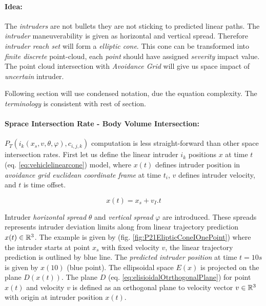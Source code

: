 \setcounter{chapter}{6}
\setcounter{section}{7}
\setcounter{subsection}{3}

\paragraph{Idea:} The \emph{intruders} are not bullets they are not sticking to predicted linear paths. The \emph{intruder} maneuverability is given as horizontal and vertical spread. Therefore \emph{intruder reach set} will form a \emph{elliptic cone}. This cone can be transformed into \emph{finite discrete } point-cloud, each \emph{point} should have assigned \emph{severity} impact value.  The point cloud intersection with  \emph{Avoidance Grid} will give us space impact of \emph{uncertain} intruder.


\begin{note}
    Following section will use condensed notation, due the equation complexity. The \emph{terminology} is consistent with rest of section. 
\end{note}

\paragraph{Sprace Intersection Rate - Body Volume Intersection:} $P_T(i_k({x}_s,{v},\theta,\varphi),c_{i,j,k})$
computation is less straight-forward than other space intersection rates. First let us define the linear intruder $i_k$ positions ${x}$ at time $t$ (eq. \ref{eq:vehiclelinearcone}) model, where ${x}(t)$ defines intruder position in \emph{avoidance grid euclidean coordinate frame} at time $t_i$, ${v}$ defines intruder velocity, and $t$ is time offset.

\begin{equation}\label{eq:vehiclelinearcone}
    x(t)=x_s + v_I.t
\end{equation}

\noindent Intruder \emph{horizontal spread} $\theta$ and \emph{vertical spread} $\varphi$ are introduced. These spreads represents intruder deviation limits along from linear trajectory prediction ${x}(t)\in\mathbb{R}^3$. The example is given by (fig. \ref{fig:P21ElipticConeIOnePoint}) where the intruder starts at point ${x}_s$ with fixed velocity $v$, the linear trajectory prediction is outlined by blue line. The \emph{predicted intruder position} at time $t=10s$ is given by ${x}(10)$ (blue point). The ellipsoidal space $E({x})$ is projected on the plane $D({x}(t))$. The plane $D$ (eq. \ref{eq:elisioidalOtrthogonalPlane}) for point ${x}(t)$ and velocity ${v}$ is defined as an orthogonal plane to velocity vector ${v}\in\mathbb{R}^3$ with origin at intruder position ${x}(t)$. 


